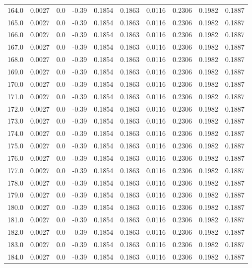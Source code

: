 \begin{longtable}{lrrrrrrrrr}
164.0 & 0.0027 & 0.0 & -0.39 & 0.1854 & 0.1863 & 0.0116 & 0.2306 & 0.1982 & 0.1887 \\
165.0 & 0.0027 & 0.0 & -0.39 & 0.1854 & 0.1863 & 0.0116 & 0.2306 & 0.1982 & 0.1887 \\
166.0 & 0.0027 & 0.0 & -0.39 & 0.1854 & 0.1863 & 0.0116 & 0.2306 & 0.1982 & 0.1887 \\
167.0 & 0.0027 & 0.0 & -0.39 & 0.1854 & 0.1863 & 0.0116 & 0.2306 & 0.1982 & 0.1887 \\
168.0 & 0.0027 & 0.0 & -0.39 & 0.1854 & 0.1863 & 0.0116 & 0.2306 & 0.1982 & 0.1887 \\
169.0 & 0.0027 & 0.0 & -0.39 & 0.1854 & 0.1863 & 0.0116 & 0.2306 & 0.1982 & 0.1887 \\
170.0 & 0.0027 & 0.0 & -0.39 & 0.1854 & 0.1863 & 0.0116 & 0.2306 & 0.1982 & 0.1887 \\
171.0 & 0.0027 & 0.0 & -0.39 & 0.1854 & 0.1863 & 0.0116 & 0.2306 & 0.1982 & 0.1887 \\
172.0 & 0.0027 & 0.0 & -0.39 & 0.1854 & 0.1863 & 0.0116 & 0.2306 & 0.1982 & 0.1887 \\
173.0 & 0.0027 & 0.0 & -0.39 & 0.1854 & 0.1863 & 0.0116 & 0.2306 & 0.1982 & 0.1887 \\
174.0 & 0.0027 & 0.0 & -0.39 & 0.1854 & 0.1863 & 0.0116 & 0.2306 & 0.1982 & 0.1887 \\
175.0 & 0.0027 & 0.0 & -0.39 & 0.1854 & 0.1863 & 0.0116 & 0.2306 & 0.1982 & 0.1887 \\
176.0 & 0.0027 & 0.0 & -0.39 & 0.1854 & 0.1863 & 0.0116 & 0.2306 & 0.1982 & 0.1887 \\
177.0 & 0.0027 & 0.0 & -0.39 & 0.1854 & 0.1863 & 0.0116 & 0.2306 & 0.1982 & 0.1887 \\
178.0 & 0.0027 & 0.0 & -0.39 & 0.1854 & 0.1863 & 0.0116 & 0.2306 & 0.1982 & 0.1887 \\
179.0 & 0.0027 & 0.0 & -0.39 & 0.1854 & 0.1863 & 0.0116 & 0.2306 & 0.1982 & 0.1887 \\
180.0 & 0.0027 & 0.0 & -0.39 & 0.1854 & 0.1863 & 0.0116 & 0.2306 & 0.1982 & 0.1887 \\
181.0 & 0.0027 & 0.0 & -0.39 & 0.1854 & 0.1863 & 0.0116 & 0.2306 & 0.1982 & 0.1887 \\
182.0 & 0.0027 & 0.0 & -0.39 & 0.1854 & 0.1863 & 0.0116 & 0.2306 & 0.1982 & 0.1887 \\
183.0 & 0.0027 & 0.0 & -0.39 & 0.1854 & 0.1863 & 0.0116 & 0.2306 & 0.1982 & 0.1887 \\
184.0 & 0.0027 & 0.0 & -0.39 & 0.1854 & 0.1863 & 0.0116 & 0.2306 & 0.1982 & 0.1887 \\

\end{longtable}
